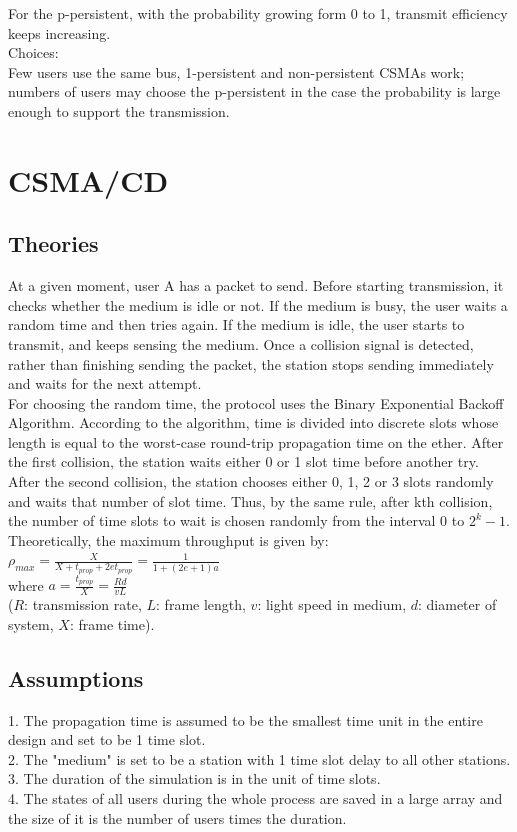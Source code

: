 \documentclass[11pt,a4paper]{report}
\begin{document}
For the p-persistent, with the probability growing form 0 to 1, transmit efficiency keeps increasing. \\

Choices: \\
Few users use the same bus, 1-persistent and non-persistent CSMAs work; numbers of users may choose the p-persistent in the case the probability is large enough to support the transmission.

\section*{CSMA/CD}
\subsection*{Theories}
At a given moment, user A has a packet to send. Before starting transmission, it checks whether the medium is idle or not. If the medium is busy, the user waits a random time and then tries again. If the medium is idle, the user starts to transmit, and keeps sensing the medium. Once a collision signal is detected, rather than finishing sending the packet, the station stops sending immediately and waits for the next attempt. \\

For choosing the random time, the protocol uses the Binary Exponential Backoff Algorithm. According to the algorithm, time is divided into discrete slots whose length is equal to the worst-case round-trip propagation time on the ether. After the first collision, the station waits either 0 or 1 slot time before another try. After the second collision, the station chooses either 0, 1, 2 or 3 slots randomly and waits that number of slot time. Thus, by the same rule, after kth collision, the number of time slots to wait is chosen randomly from the interval 0 to \(2^k-1\). \\

Theoretically, the maximum throughput is given by: \\

\qquad \(\rho_{max} = \frac{X}{X+t_{prop}+2et_{prop}} = \frac{1}{1+(2e+1)a}\) \\
where \(a = \frac{t_{prop}}{X} = \frac{Rd}{vL}\) \\
(\(R\): transmission rate, \(L\): frame length, \(v\): light speed in medium, \(d\): diameter of system, \(X\): frame time).

\subsection*{Assumptions}
1. The propagation time is assumed to be the smallest time unit in the entire design and set to be 1 time slot. \\
2. The "medium" is set to be a station with 1 time slot delay to all other stations. \\
3. The duration of the simulation is in the unit of time slots. \\
4. The states of all users during the whole process are saved in a large array and the size of it is the number of users times the duration.
\end{document}
